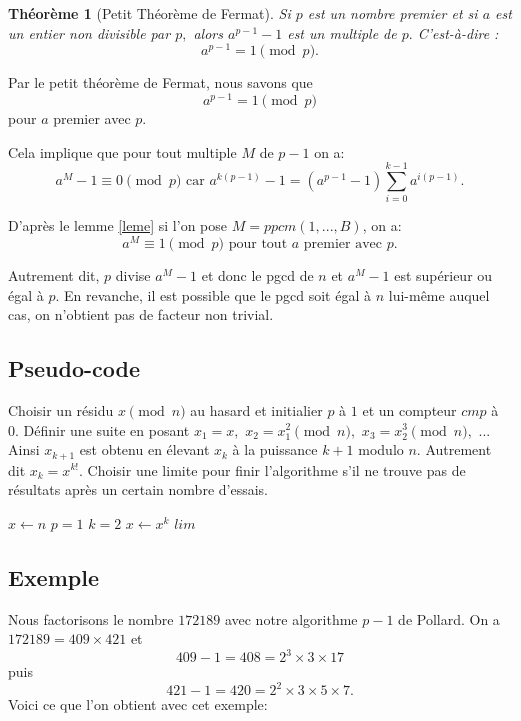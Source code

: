 \documentclass[french, 12pt, titlepage]{article}
\newtheorem{theoreme}{Th{\'e}or{\`e}me}
\begin{document}
\begin{theoreme}[Petit Théorème de Fermat]
Si $p$ est un nombre premier et si $a$ est un entier non divisible par $p,$ alors $a^{p-1} - 1$ est un multiple de $p.$ C'est-à-dire : \[a^{p-1} = 1 \pmod p .\]
\end{theoreme}
Par le petit théorème de Fermat, nous savons que \[a^{p-1} = 1 \pmod p \] pour $a$ premier avec $p.$ 

Cela implique que pour tout multiple $M$ de $p-1$ on a: \[ a^M - 1 \equiv 0 \pmod p \text{ car } a^{k(p-1)} - 1 = (a^{p-1} - 1 )\sum\limits_{i=0}^{k-1} a^{i(p-1)} . \]

D'après le lemme \ref{leme} si l'on pose $M = ppcm(1, ..., B)$, on a: \[ a^M \equiv 1 \pmod p \text{ pour tout } a \text{ premier avec } p . \]

Autrement dit, $p$ divise $a^M - 1$ et donc le pgcd de $n$ et $a^M - 1$ est supérieur ou égal à $p.$
En revanche, il est possible que le pgcd soit égal à $n$ lui-même auquel cas, on n'obtient pas de facteur non trivial.

\subsection{Pseudo-code}

Choisir un résidu $x \pmod n$ au hasard et initialier $p$ à $1$ et un compteur $cmp$ à $0.$
Définir une suite en posant $x_1 = x,$ $x_2 = x_1^2 \pmod n,$ $x_3 = x_2^3 \pmod n,$ ... Ainsi $x_ {k+1}$ est obtenu en élevant $x_k$ à la puissance $k+1$ modulo $n.$ Autrement dit $x_k = x^{k!}.$
Choisir une limite pour finir l'algorithme s'il ne trouve pas de résultats après un certain nombre d'essais.

\begin{algorithm}
\caption{Factorisation de $n$ par $p-1$ de Pollard}
\BlankLine
$x \gets n$\;
$p = 1$\;
$k = 2$\;
$x \gets x^k$\;
$lim$\;
\end{algorithm}

\subsection{Exemple}

Nous factorisons le nombre $172189$ avec notre algorithme $p-1$ de Pollard.
On a $172189 = 409 \times 421$ et \[409 - 1 = 408 = 2^3 \times 3 \times 17 \] puis \[421-1 = 420 = 2^2 \times 3 \times 5 \times 7.\] 
Voici ce que l'on obtient avec cet exemple:
\end{document}
